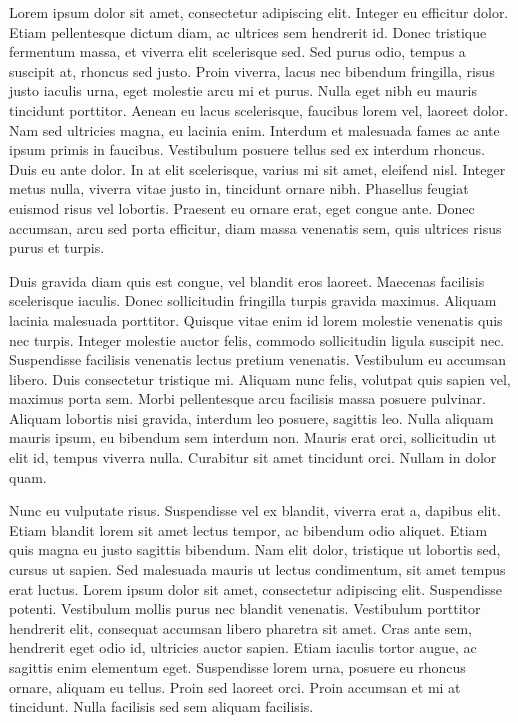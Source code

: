 \documentclass[
  a4paper,  %
  twoside,  %
  bibliography=totoc,
  headsepline,
  cleardoublepage=empty,
  parskip=half,
  draft=false
]{scrbook}
\begin{document}
Lorem ipsum dolor sit amet, consectetur adipiscing elit. Integer eu efficitur dolor. Etiam pellentesque dictum diam, ac ultrices sem hendrerit id. Donec tristique fermentum massa, et viverra elit scelerisque sed. Sed purus odio, tempus a suscipit at, rhoncus sed justo. Proin viverra, lacus nec bibendum fringilla, risus justo iaculis urna, eget molestie arcu mi et purus. Nulla eget nibh eu mauris tincidunt porttitor. Aenean eu lacus scelerisque, faucibus lorem vel, laoreet dolor. Nam sed ultricies magna, eu lacinia enim. Interdum et malesuada fames ac ante ipsum primis in faucibus. Vestibulum posuere tellus sed ex interdum rhoncus. Duis eu ante dolor. In at elit scelerisque, varius mi sit amet, eleifend nisl. Integer metus nulla, viverra vitae justo in, tincidunt ornare nibh. Phasellus feugiat euismod risus vel lobortis. Praesent eu ornare erat, eget congue ante. Donec accumsan, arcu sed porta efficitur, diam massa venenatis sem, quis ultrices risus purus et turpis.

Duis gravida diam quis est congue, vel blandit eros laoreet. Maecenas facilisis scelerisque iaculis. Donec sollicitudin fringilla turpis gravida maximus. Aliquam lacinia malesuada porttitor. Quisque vitae enim id lorem molestie venenatis quis nec turpis. Integer molestie auctor felis, commodo sollicitudin ligula suscipit nec. Suspendisse facilisis venenatis lectus pretium venenatis. Vestibulum eu accumsan libero. Duis consectetur tristique mi. Aliquam nunc felis, volutpat quis sapien vel, maximus porta sem. Morbi pellentesque arcu facilisis massa posuere pulvinar. Aliquam lobortis nisi gravida, interdum leo posuere, sagittis leo. Nulla aliquam mauris ipsum, eu bibendum sem interdum non. Mauris erat orci, sollicitudin ut elit id, tempus viverra nulla. Curabitur sit amet tincidunt orci. Nullam in dolor quam.

Nunc eu vulputate risus. Suspendisse vel ex blandit, viverra erat a, dapibus elit. Etiam blandit lorem sit amet lectus tempor, ac bibendum odio aliquet. Etiam quis magna eu justo sagittis bibendum. Nam elit dolor, tristique ut lobortis sed, cursus ut sapien. Sed malesuada mauris ut lectus condimentum, sit amet tempus erat luctus. Lorem ipsum dolor sit amet, consectetur adipiscing elit. Suspendisse potenti. Vestibulum mollis purus nec blandit venenatis. Vestibulum porttitor hendrerit elit, consequat accumsan libero pharetra sit amet. Cras ante sem, hendrerit eget odio id, ultricies auctor sapien. Etiam iaculis tortor augue, ac sagittis enim elementum eget. Suspendisse lorem urna, posuere eu rhoncus ornare, aliquam eu tellus. Proin sed laoreet orci. Proin accumsan et mi at tincidunt. Nulla facilisis sed sem aliquam facilisis.
\end{document}
